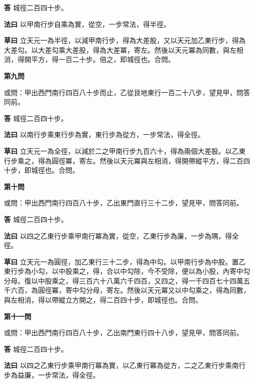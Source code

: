 \documentclass[11pt,a4paper]{article}
\newcommand{\problem}[1]{\par\noindent\textbf{\color{problemcolor}#1}\par\nopagebreak}
\newcommand{\answer}[1]{\par\noindent\textbf{答} #1\par}
\newcommand{\method}[1]{\par\noindent\textbf{法曰} #1\par}
\newcommand{\workings}[1]{\par\noindent\textbf{草曰} #1\par}
\begin{document}
\answer{城徑二百四十步。}

\method{以甲南行步自乘為實，從空，一步常法，得半徑。}

\workings{立天元一為半徑，以減甲南行步，得為大差股，又以天元加乙東行步，得為大差勾。以大差勾乘大差股，得為大差冪，寄左。然後以天元冪為同數，與左相消，得開平方，得一百二十步。倍之，即城徑也。合問。}

\vspace{0.5cm}

\problem{第九問}

\noindent 或問：甲出西門南行四百八十步而止，乙從艮地東行一百二十八步，望見甲，問答同前。

\answer{城徑二百四十步。}

\method{以南行步乘東行步為實，東行步為從方，一步常法，得全徑。}

\workings{立天元一為全徑，以減於二之甲南行步九百六十，得為兩個大差股。以乙東行步乘之，得為圓徑冪，寄左。然後以天元冪與左相消，得開帶縱平方，得二百四十步，即城徑也。合問。}

\vspace{0.5cm}

\problem{第十問}

\noindent 或問：甲出西門南行四百八十步，乙出東門直行三十二步，望見甲，問答同前。

\answer{城徑二百四十步。}

\method{以四之乙東行步乘甲南行冪為實，從空，乙東行步為廉，一步為隅，得全徑。}

\workings{立天元一為圓徑，加乙東行三十二步，得為中勾。以甲南行步為中股。置乙東行步為小勾，以中股乘之，得，合以中勾除，今不受除，便以為小股，內寄中勾分母。復以中股乘之，得三百六十八萬六千四百，又四之，得一千四百七十四萬五千六百，為圓徑冪，寄中勾分母，寄左。然後以天元冪又以中勾乘之，得為同數，與左相消，得以帶縱立方開之，得二百四十步，即城徑也。合問。}

\vspace{0.5cm}

\problem{第十一問}

\noindent 或問：甲出西門南行四百八十步，乙出南門東行四十八步，望見甲，問答同前。

\answer{城徑二百四十步。}

\method{以四之乙東行步乘甲南行冪為實，以乙東行冪為從方，二之乙東行步乘南行步為益廉，一步常法，得全徑。}
\end{document}
